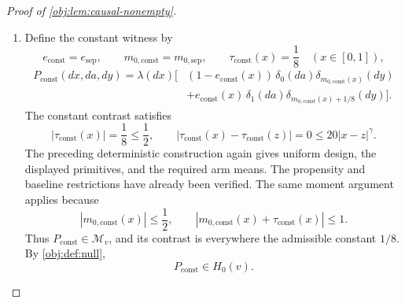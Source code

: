 \documentclass[11pt]{article}
\begin{document}
\begin{proof}[Proof of \cref{obj:lem:causal-nonempty}]
\begin{enumerate}
\item Define the constant witness by
\[
e_{\mathrm{const}}=e_{\mathrm{sep}},
\qquad
m_{0,\mathrm{const}}=m_{0,\mathrm{sep}},
\qquad
\tau_{\mathrm{const}}(x)=\frac18
\quad(x\in[0,1]),
\]
\[
\begin{aligned}
P_{\mathrm{const}}(dx,da,dy)
=\lambda(dx)\bigl[
 &(1-e_{\mathrm{const}}(x))\,
 \delta_0(da)\delta_{m_{0,\mathrm{const}}(x)}(dy)\\
 &+e_{\mathrm{const}}(x)\,
 \delta_1(da)\delta_{m_{0,\mathrm{const}}(x)+1/8}(dy)
\bigr].
\end{aligned}
\]
The constant contrast satisfies
\[
|\tau_{\mathrm{const}}(x)|=\frac18\le\frac12,
\qquad
|\tau_{\mathrm{const}}(x)-\tau_{\mathrm{const}}(z)|
=0\le20|x-z|^\gamma.
\]
The preceding deterministic construction again gives uniform design, the displayed primitives, and the required arm means. The propensity and baseline restrictions have already been verified. The same moment argument applies because
\[
|m_{0,\mathrm{const}}(x)|\le\frac12,
\qquad
|m_{0,\mathrm{const}}(x)+\tau_{\mathrm{const}}(x)|\le1.
\]
Thus \(P_{\mathrm{const}}\in\mathcal M_v\), and its contrast is everywhere the admissible constant \(1/8\). By \cref{obj:def:null},
\[
P_{\mathrm{const}}\in H_0(v).
\]


\end{enumerate}
\end{proof}
\end{document}
